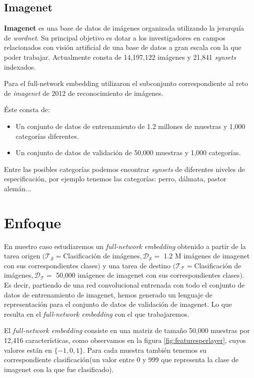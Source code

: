 \documentclass[12,twoside]{TFG-GM}
\theoremstyle{definition}
\theoremstyle{remark}
\begin{document}
\subsection{Imagenet}

\textbf{Imagenet} es una base de datos de imágenes organizada utilizando la jerarquía de \textit{wordnet}. Su principal objetivo es dotar a los investigadores en campos relacionados con visión artificial de una base de datos a gran escala con la que poder trabajar. Actualmente consta de 14,197,122 imágenes y  21,841 \textit{synsets} indexados.  

Para el full-network embedding utilizaron el subconjunto correspondiente al reto de \textit{imagenet} de 2012 de reconocimiento de imágenes. 

Éste consta de:
\begin{itemize}
\item Un conjunto de datos de entrenamiento de 1.2 millones de muestras y 1,000 categorías diferentes.
\item Un conjunto de datos de validación de 50,000 muestras y 1,000 categorías. 
\end{itemize}

Entre las posibles categorías podemos encontrar \textit{synsets} de diferentes niveles de especificación, por ejemplo tenemos las categorías: perro, dálmata, pastor alemán... 
\newpage
\section{Enfoque}
\label{sec:enfoque}
En nuestro caso estudiaremos un \textit{full-network embedding} obtenido a partir de la tarea origen  $(\mathcal{T_S} = $Clasificación de imágenes$,\mathcal{D_S} =$ 1.2 M imágenes de imagenet con sus correspondientes clases$ )$ y una tarea de destino $(\mathcal{T_T} = $Clasificación de imágenes$,\mathcal{D_T} =$ 50,000 imágenes de imagenet con sus correspondientes clases$ )$. Es decir, partiendo de una red convolucional entrenada con todo el conjunto de datos de entrenamiento de imagenet, hemos generado un lenguaje de representación para el conjunto de datos de validación de imagenet. Lo que resulta en el \textit{full-network embedding} con el que trabajaremos. 

El \textit{full-network embedding} consiste en una matriz de tamaño 50,000 muestras por 12,416 características, como observamos en la figura \ref{fig:featuresperlayer}, cuyos valores están en $\{-1,0,1\}$. Para cada muestra también tenemos su correspondiente clasificación(un valor entre 0 y 999 que representa la clase de imagenet con la que fue clasificado).
\end{document}

